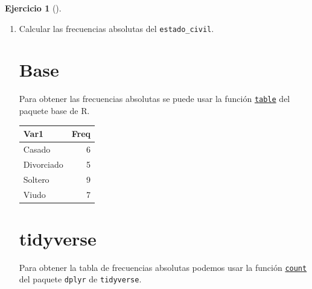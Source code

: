 \documentclass[
  spanish,
  a4paper,
]{scrreport}
\newenvironment{Shaded}{\begin{snugshade}}{\end{snugshade}}
\newcommand{\FunctionTok}[1]{\textcolor[rgb]{0.28,0.35,0.67}{#1}}
\newcommand{\NormalTok}[1]{\textcolor[rgb]{0.00,0.23,0.31}{#1}}
\newcommand{\SpecialCharTok}[1]{\textcolor[rgb]{0.37,0.37,0.37}{#1}}
\theoremstyle{definition}
\newtheorem{exercise}{Ejercicio}[chapter]
\theoremstyle{remark}
\begin{document}
\begin{exercise}[]
\begin{enumerate}
\begin{tcolorbox}
  \end{tcolorbox}
\item
  Calcular las frecuencias absolutas del \texttt{estado\_civil}.

  \begin{tcolorbox}[enhanced jigsaw, colback=white, coltitle=black, toprule=.15mm, rightrule=.15mm, opacitybacktitle=0.6, opacityback=0, bottomtitle=1mm, toptitle=1mm, titlerule=0mm, breakable, leftrule=.75mm, title=\textcolor{quarto-callout-tip-color}{\faLightbulb}\hspace{0.5em}{Solución}, arc=.35mm, left=2mm, bottomrule=.15mm, colframe=quarto-callout-tip-color-frame, colbacktitle=quarto-callout-tip-color!10!white]

  \section{Base}

  Para obtener las frecuencias absolutas se puede usar la función
  \href{https://www.rdocumentation.org/packages/base/versions/3.6.2/topics/table}{\texttt{table}}
  del paquete base de R.

\begin{Shaded}
\end{Shaded}

  \begin{longtable}[]{@{}lr@{}}
  \toprule\noalign{}
  Var1 & Freq \\
  \midrule\noalign{}
  \endhead
  \bottomrule\noalign{}
  \endlastfoot
  Casado & 6 \\
  Divorciado & 5 \\
  Soltero & 9 \\
  Viudo & 7 \\
  \end{longtable}

  \section{tidyverse}

  Para obtener la tabla de frecuencias absolutas podemos usar la función
  \href{https://aprendeconalf.es/manual-r/06-preprocesamiento.html\#conteo-del-n\%C3\%BAmero-de-observaciones}{\texttt{count}}
  del paquete \texttt{dplyr} de \texttt{tidyverse}.


\end{tcolorbox}
\end{enumerate}
\end{exercise}
\end{document}
